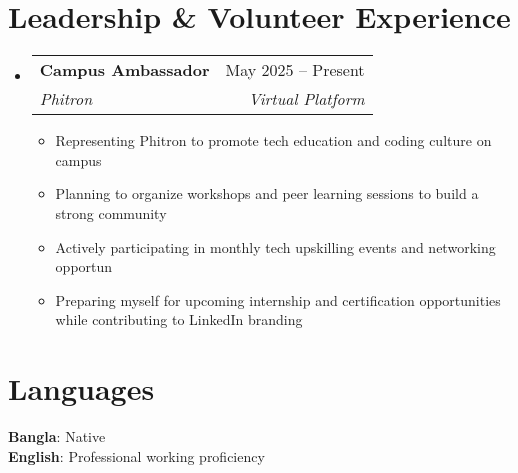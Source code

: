 \documentclass[a4paper,11pt]{article}
\makeatletter
\newcommand{\resumeItem}[1]{
  \item\small{
    {#1 \vspace{-2pt}}
  }
}
\newcommand{\resumeSubheading}[4]{
  \vspace{-2pt}\item
    \begin{tabular*}{0.97\textwidth}[t]{l@{\extracolsep{\fill}}r}
      \textbf{#1} & #2 \\
      \textit{\small#3} & \textit{\small #4} \\
    \end{tabular*}\vspace{-7pt}
}
\newcommand{\resumeSubHeadingListStart}{\begin{itemize}[leftmargin=0.15in, label={}]}
\newcommand{\resumeSubHeadingListEnd}{\end{itemize}}
\newcommand{\resumeItemListStart}{\begin{itemize}}
\newcommand{\resumeItemListEnd}{\end{itemize}\vspace{-5pt}}
\makeatother
\begin{document}
\section{Leadership \& Volunteer Experience}
  \resumeSubHeadingListStart
    \resumeSubheading
      {Campus Ambassador}{May 2025 -- Present}
      {Phitron}{Virtual Platform}
      \resumeItemListStart
        \resumeItem{Representing Phitron to promote tech education and coding culture on campus}
        \resumeItem{Planning to organize workshops and peer learning sessions to build a strong community}
        \resumeItem{Actively participating in monthly tech upskilling events and networking opportun}
        \resumeItem{Preparing myself for upcoming internship and certification opportunities while contributing to LinkedIn branding}
      \resumeItemListEnd
  \resumeSubHeadingListEnd

\section{Languages}
  \begin{itemize}[leftmargin=0.15in, label={}]
    \small{\item{
      \textbf{Bangla}{: Native} \\
      \textbf{English}{: Professional working proficiency}
    }}
  \end{itemize}

\end{document}
